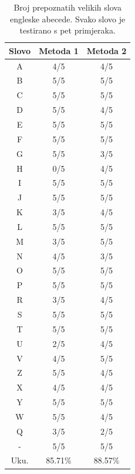 \begin{table}[]
\centering
\caption{Broj prepoznatih velikih slova engleske abecede. Svako slovo je testirano s pet primjeraka.}
\label{eng_abc}
\begin{tabular}{c|c|c}
Slovo & Metoda 1 & Metoda 2 \\ \hline
A & 4/5 & 4/5 \\ \hline
B & 5/5 & 5/5 \\ \hline
C & 5/5 & 5/5 \\ \hline
D & 5/5 & 4/5 \\ \hline
E & 5/5 & 5/5 \\ \hline
F & 5/5 & 5/5 \\ \hline
G & 5/5 & 3/5 \\ \hline
H & 0/5 & 4/5 \\ \hline
I & 5/5 & 5/5 \\ \hline
J & 5/5 & 5/5 \\ \hline
K & 3/5 & 4/5 \\ \hline
L & 5/5 & 5/5 \\ \hline
M & 3/5 & 5/5 \\ \hline
N & 4/5 & 3/5 \\ \hline
O & 5/5 & 5/5 \\ \hline
P & 5/5 & 5/5 \\ \hline
R & 3/5 & 4/5 \\ \hline
S & 5/5 & 5/5 \\ \hline
T & 5/5 & 5/5 \\ \hline
U & 2/5 & 4/5 \\ \hline
V & 4/5 & 5/5 \\ \hline
Z & 5/5 & 4/5 \\ \hline
X & 4/5 & 4/5 \\ \hline
Y & 5/5 & 5/5 \\ \hline
W & 5/5 & 4/5 \\ \hline
Q & 3/5 & 2/5 \\ \hline
- & 5/5 & 5/5 \\ \hline
Uku. & 85.71\% & 88.57\%
\end{tabular}
\end{table}

